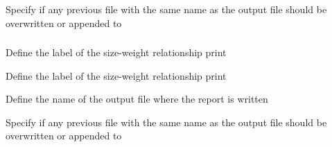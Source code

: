  {Specify if any previous file with the same name as the output file should be overwritten or appended to}

\subsubsection[Print the weight-at-size]{}

 {Define the label of the size-weight relationship print}

 {Define the label of the size-weight relationship print}

 {Define the name of the output file where the report is written}

 {Specify if any previous file with the same name as the output file should be overwritten or appended to}
